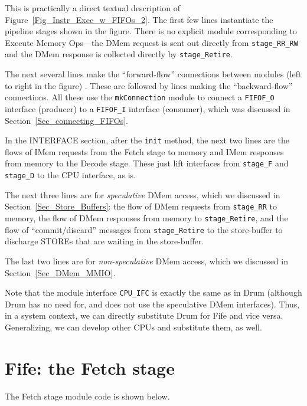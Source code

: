 This is practically a direct textual description of
Figure~\ref{Fig_Instr_Exec_w_FIFOs_2}.  The first few lines
instantiate the pipeline stages shown in the figure.  There is no
explicit module corresponding to Execute Memory Ops---the DMem request
is sent out directly from \verb|stage_RR_RW| and the DMem response is
collected directly by \verb|stage_Retire|.

The next several lines make the ``forward-flow'' connections between
modules (left to right in the figure) .  These are followed by lines
making the ``backward-flow'' connections.  All these use the
\verb|mkConnection| module to connect a \verb|FIFOF_O| interface
(producer) to a \verb|FIFOF_I| interface (consumer), which was
discussed in Section~\ref{Sec_connecting_FIFOs}.

In the INTERFACE section, after the \verb|init| method, the next two
lines are the flows of IMem requests from the Fetch stage to memory
and IMem responses from memory to the Decode stage.  These just lift
interfaces from \verb|stage_F| and \verb|stage_D| to the CPU
interface, as is.

The next three lines are for \emph{speculative} DMem access, which we
discussed in Section~\ref{Sec_Store_Buffers}: the flow of DMem
requests from \verb|stage_RR| to memory, the flow of DMem responses
from memory to \verb|stage_Retire|, and the flow of ``commit/discard''
messages from \verb|stage_Retire| to the store-buffer to discharge
STOREs that are waiting in the store-buffer.

The last two lines are for \emph{non-speculative} DMem access, which
we discussed in Section~\ref{Sec_DMem_MMIO}.

Note that the module interface \verb|CPU_IFC| is exactly the same as
in Drum (although Drum has no need for, and does not use the
speculative DMem interfaces).  Thus, in a system context, we can
directly substitute Drum for Fife and vice versa.  Generalizing, we
can develop other CPUs and substitute them, as well.


\section{Fife: the Fetch stage}

\label{Sec_Fife_Fetch_stage}

The Fetch stage module code is shown below.

